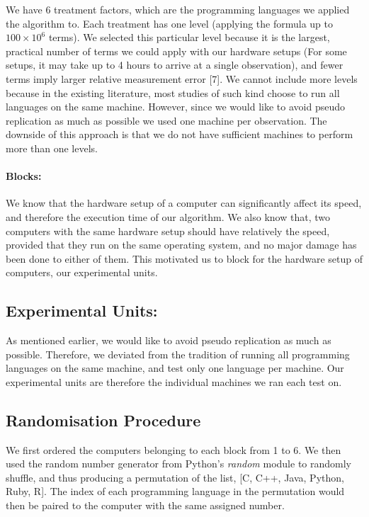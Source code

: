 \documentclass[12pt,halfline,a4paper,]{ouparticle}
\begin{document}
We have 6 treatment factors, which are the programming languages we
applied the algorithm to. Each treatment has one level (applying the
formula up to \(100 \times 10^6\) terms). We selected this particular
level because it is the largest, practical number of terms we could
apply with our hardware setups (For some setups, it may take up to 4
hours to arrive at a single observation), and fewer terms imply larger
relative measurement error {[}7{]}. We cannot include more levels
because in the existing literature, most studies of such kind choose to
run all languages on the same machine. However, since we would like to
avoid pseudo replication as much as possible we used one machine per
observation. The downside of this approach is that we do not have
sufficient machines to perform more than one levels.

\hypertarget{blocks}{%
\paragraph{Blocks:}\label{blocks}}

We know that the hardware setup of a computer can significantly affect
its speed, and therefore the execution time of our algorithm. We also
know that, two computers with the same hardware setup should have
relatively the speed, provided that they run on the same operating
system, and no major damage has been done to either of them. This
motivated us to block for the hardware setup of computers, our
experimental units.

\hypertarget{experimental-units}{%
\subsection{Experimental Units:}\label{experimental-units}}

As mentioned earlier, we would like to avoid pseudo replication as much
as possible. Therefore, we deviated from the tradition of running all
programming languages on the same machine, and test only one language
per machine. Our experimental units are therefore the individual
machines we ran each test on.

\hypertarget{randomisation-procedure}{%
\subsection{Randomisation Procedure}\label{randomisation-procedure}}

We first ordered the computers belonging to each block from 1 to 6. We
then used the random number generator from Python's \emph{random} module
to randomly shuffle, and thus producing a permutation of the list, {[}C,
C++, Java, Python, Ruby, R{]}. The index of each programming language in
the permutation would then be paired to the computer with the same
assigned number.
\end{document}
